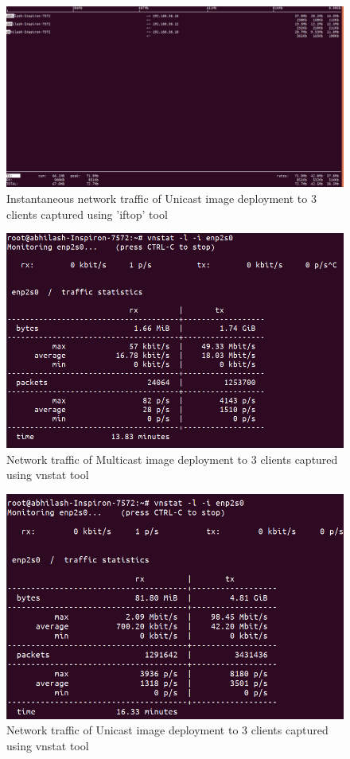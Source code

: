 \documentclass[a4paper,12pt]{article}
\begin{document}
\begin{figure}
  \centering
  \includegraphics[width=1\linewidth]{unicast_3_iftop.png}
  \caption{ Instantaneous network traffic of Unicast image deployment to 3 clients captured using 'iftop' tool}
  \label{unicast_iftop}
\end{figure}

\begin{figure}
  \centering
  \includegraphics[width=1\linewidth]{multicast_3.png}
  \caption{Network traffic of Multicast image deployment to 3 clients captured using vnstat \cite{vnstat} tool}
  \label{multicast_vnstat}
\end{figure}

\begin{figure}
  \centering
  \includegraphics[width=1\linewidth]{unicast_3_vmstat.png}
  \caption{Network traffic of Unicast image deployment to 3 clients captured using vnstat tool}
  \label{unicast_vnstat}
\end{figure}
\end{document}
